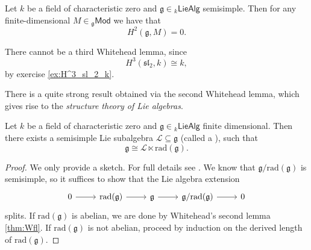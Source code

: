 \begin{theorem}
	\label{thm:Wfl}
	Let $k$ be a field of characteristic zero and $\mathfrak{g} \in {_{k}}\mathsf{LieAlg}$ semisimple. Then for any finite-dimensional $M \in {_{\mathfrak{g}}}\mathsf{Mod}$ we have that
	\begin{equation*}
		H^2(\mathfrak{g},M) = 0.
	\end{equation*}
\end{theorem}

\begin{remark}
	There cannot be a third Whitehead lemma, since
	\begin{equation*}
		H^3(\mathfrak{sl}_2,k) \cong k,
	\end{equation*}
	\noindent by exercise \ref{ex:H^3_sl_2_k}.
\end{remark}

There is a quite strong result obtained via the second Whitehead lemma, which gives rise to the \emph{structure theory of Lie algebras}.

\begin{theorem}
	Let $k$ be a field of characteristic zero and $\mathfrak{g} \in {_k}\mathsf{LieAlg}$ finite dimensional. Then there exists a semisimple Lie subalgebra $\mathcal{L} \subseteq \mathfrak{g}$ (called a ), such that
	\begin{equation*}
		\mathfrak{g} \cong \mathcal{L} \ltimes \mathrm{rad}(\mathfrak{g}).
	\end{equation*}
\end{theorem}

\begin{proof}
	We only provide a sketch. For full details see \cite[247]{weibel:homological_algebra:1994}. We know that $\mathfrak{g}/\mathrm{rad}(\mathfrak{g})$ is semisimple, so it suffices to show that the Lie algebra extension
	\begin{equation*}
		\begin{tikzcd}
			0 \arrow[r] & \mathrm{rad}(\mathfrak{g}) \arrow[r] & \mathfrak{g} \arrow[r] & \mathfrak{g}/\mathrm{rad}(\mathfrak{g}) \arrow[r] & 0
		\end{tikzcd}
	\end{equation*}
	\noindent splits. If $\mathrm{rad}(\mathfrak{g})$ is abelian, we are done by Whitehead's second lemma \ref{thm:Wfl}. If $\mathrm{rad}(\mathfrak{g})$ is not abelian, proceed by induction on the derived length of $\mathrm{rad}(\mathfrak{g})$.
\end{proof}

\printbibliography

